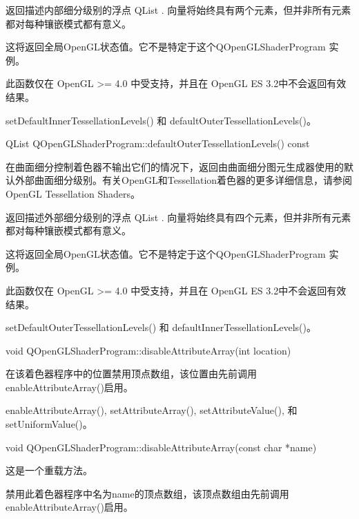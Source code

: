 返回描述内部细分级别的浮点 QList . 向量将始终具有两个元素，但并非所有元素都对每种镶嵌模式都有意义。


\begin{notice}
这将返回全局OpenGL状态值。它不是特定于这个QOpenGLShaderProgram 实例。
\end{notice}


\begin{notice}
此函数仅在 OpenGL >= 4.0 中受支持，并且在 OpenGL ES 3.2中不会返回有效结果。
\end{notice}


\begin{seeAlso}
setDefaultInnerTessellationLevels() 和 defaultOuterTessellationLevels()。
\end{seeAlso}

QList QOpenGLShaderProgram::defaultOuterTessellationLevels() const

在曲面细分控制着色器不输出它们的情况下，返回由曲面细分图元生成器使用的默认外部曲面细分级别。有关OpenGL和Tessellation着色器的更多详细信息，请参阅 OpenGL Tessellation Shaders。

返回描述外部细分级别的浮点 QList . 向量将始终具有四个元素，但并非所有元素都对每种镶嵌模式都有意义。

\begin{notice}
这将返回全局OpenGL状态值。它不是特定于这个QOpenGLShaderProgram 实例。
\end{notice}

\begin{notice}
此函数仅在 OpenGL >= 4.0 中受支持，并且在 OpenGL ES 3.2中不会返回有效结果。
\end{notice}


\begin{seeAlso}
setDefaultOuterTessellationLevels() 和 defaultInnerTessellationLevels()。
\end{seeAlso}

void QOpenGLShaderProgram::disableAttributeArray(int location)

在该着色器程序中的位置禁用顶点数组，该位置由先前调用 enableAttributeArray()启用。


\begin{seeAlso}
enableAttributeArray(), setAttributeArray(), setAttributeValue(), 和 setUniformValue()。
\end{seeAlso}

void QOpenGLShaderProgram::disableAttributeArray(const char *name)

这是一个重载方法。

禁用此着色器程序中名为name的顶点数组，该顶点数组由先前调用 enableAttributeArray()启用。


